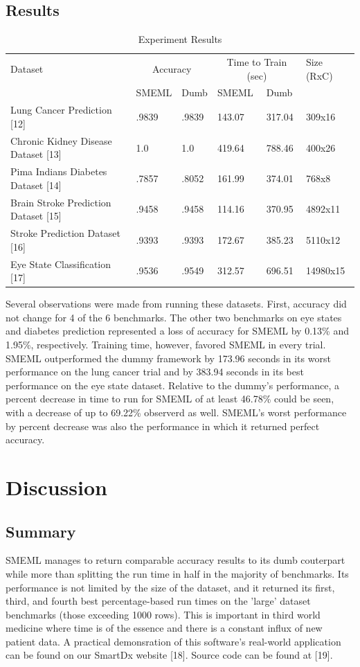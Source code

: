 \documentclass{article}
\begin{document}
\subsection{Results}
\begin{table}
  \caption{Experiment Results}
  \label{model-options-table}
  \centering
  \begin{tabular}{llllll}
    \toprule
    Dataset & \multicolumn{2}{c}{Accuracy} & \multicolumn{2}{c}{Time to Train (sec)} & Size (RxC)\\
    \cmidrule(lr){2-3} \cmidrule(lr){4-5}
    & SMEML & Dumb & SMEML & Dumb \\
    \midrule
    Lung Cancer Prediction [12] & .9839 & .9839 & 143.07 & 317.04 & 309x16\\
    Chronic Kidney Disease Dataset [13] & 1.0 & 1.0 & 419.64 & 788.46 & 400x26\\
    Pima Indians Diabetes Dataset [14] & .7857 & .8052 & 161.99 & 374.01 & 768x8 \\
    Brain Stroke Prediction Dataset [15] & .9458 & .9458 & 114.16 & 370.95 & 4892x11\\
    Stroke Prediction Dataset [16] & .9393 & .9393 & 172.67 & 385.23 & 5110x12 \\
    Eye State Classification [17] & .9536 & .9549 & 312.57 & 696.51 & 14980x15\\ 
    \bottomrule
  \end{tabular}
\end{table}

Several observations were made from running these datasets. First, accuracy did not change for 4 of the 6 benchmarks. The other two benchmarks on eye states and diabetes prediction represented a loss of accuracy for SMEML by 0.13\% and 1.95\%, respectively. Training time, however, favored SMEML in every trial. SMEML outperformed the dummy framework by 173.96 seconds in its worst performance on the lung cancer trial and by 383.94 seconds in its best performance on the eye state dataset. Relative to the dummy's performance, a percent decrease in time to run for SMEML of at least 46.78\% could be seen, with a decrease of up to 69.22\% observerd as well. SMEML's worst performance by percent decrease was also the performance in which it returned perfect accuracy. 
\section{Discussion}
\subsection{Summary}
SMEML manages to return comparable accuracy results to its dumb couterpart while more than splitting the run time in half in the majority of benchmarks. Its performance is not limited by the size of the dataset, and it returned its first, third, and fourth best percentage-based run times on the 'large' dataset benchmarks (those exceeding 1000 rows). This is important in third world medicine where time is of the essence and there is a constant influx of new patient data. A practical demonsration of this software's real-world application can be found on our SmartDx website [18]. Source code can be found at [19].
\end{document}
